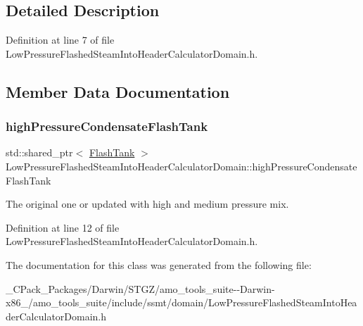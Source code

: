 \subsection{Detailed Description}


Definition at line 7 of file Low\+Pressure\+Flashed\+Steam\+Into\+Header\+Calculator\+Domain.\+h.



\subsection{Member Data Documentation}
\mbox{\label{class_low_pressure_flashed_steam_into_header_calculator_domain_a41d5597715b028376dc2c0a880a94e9f}} 
\subsubsection{\texorpdfstring{high\+Pressure\+Condensate\+Flash\+Tank}{highPressureCondensateFlashTank}}
{\footnotesize\ttfamily std\+::shared\+\_\+ptr$<$ \hyperlink{class_flash_tank}{Flash\+Tank} $>$ Low\+Pressure\+Flashed\+Steam\+Into\+Header\+Calculator\+Domain\+::high\+Pressure\+Condensate\+Flash\+Tank}

The original one or updated with high and medium pressure mix. 

Definition at line 12 of file Low\+Pressure\+Flashed\+Steam\+Into\+Header\+Calculator\+Domain.\+h.



The documentation for this class was generated from the following file\+:\begin{DoxyCompactItemize}
\item 
\+\_\+\+C\+Pack\+\_\+\+Packages/\+Darwin/\+S\+T\+G\+Z/amo\+\_\+tools\+\_\+suite-\/-\/\+Darwin-\/x86\+\_/amo\+\_\+tools\+\_\+suite/include/ssmt/domain/Low\+Pressure\+Flashed\+Steam\+Into\+Header\+Calculator\+Domain.\+h\end{DoxyCompactItemize}
